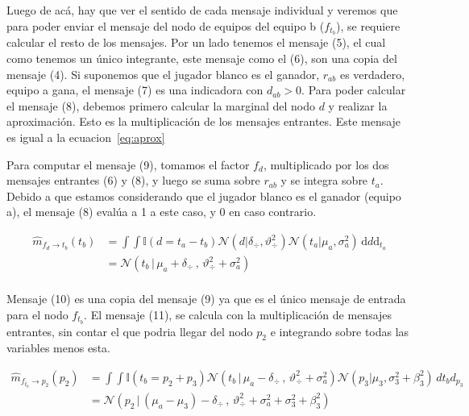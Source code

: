 \documentclass[11pt,twoside,spanish]{report} %
\begin{document}
Luego de ac\'a, hay que ver el sentido de cada mensaje individual y veremos que para poder enviar el mensaje del nodo de equipos del equipo b ($f_{t_b}$), se requiere calcular el resto de los mensajes.
Por un lado tenemos el mensaje (5), el cual como tenemos un \'unico integrante, este mensaje como el (6), son una copia del mensaje (4).
Si suponemos que el jugador blanco es el ganador, $r_{ab}$ es verdadero, equipo a gana, el mensaje (7) es una indicadora con $d_{ab}>0$.
Para poder calcular el mensaje (8), debemos primero calcular la marginal del nodo $d$ y realizar la aproximaci\'on.
Esto es la multiplicaci\'on de los mensajes entrantes.
Este mensaje es igual a la ecuacion~\ref{eq:aprox}

Para computar el mensaje (9), tomamos el factor $f_d$, multiplicado por los dos mensajes entrantes (6) y (8), y luego se suma sobre $r_{ab}$ y se integra sobre $t_a$.
Debido a que estamos considerando que el jugador blanco es el ganador (equipo a), el mensaje (8) eval\'ua a 1 a este caso, y 0 en caso contrario.

\begin{equation}
\begin{split}
\widehat{m}_{f_{d} \rightarrow t_b}(t_b)  & = \int \int \mathbb{I}(d = t_a - t_b) \mathcal{N}(d | \delta_{\div}, \vartheta_{\div}^2) \mathcal{N}(t_a | \mu_a , \sigma_a^2 )  \, \text{d}{d} \text{d}_{t_a} \\
&= \mathcal{N}(t_b \, | \, \mu_a + \delta_{\div} \, , \, \vartheta_{\div}^2 + \sigma_a^2) \\
\end{split}
\end{equation}

Mensaje (10) es una copia del mensaje (9) ya que es el \'unico mensaje de entrada para el nodo $f_{t_b}$.
El mensaje (11), se calcula con la multiplicaci\'on de mensajes entrantes, sin contar el que podria llegar del nodo $p_2$ e integrando sobre todas las variables menos esta.

\begin{equation}
\begin{split}
\widehat{m}_{f_{t_b} \rightarrow p_2}(p_2)  & =\int \int \mathbb{I}(t_b = p_2 + p_3) \mathcal{N}(t_b \, | \, \mu_a - \delta_{\div} \, , \, \vartheta_{\div}^2 + \sigma_a^2) \mathcal{N}(p_3 | \mu_3 , \sigma_3^2 + \beta_3^2)  \, d{t_b} d_{p_3} \\
&=  \mathcal{N}( p_2 \,|\,  (\mu_a - \mu_3) - \delta_{\div}  \,,\,\vartheta_{\div}^2 + \sigma_a^2 + \sigma_3^2 + \beta_3^2)  \\
\end{split}
\end{equation}
\end{document}

